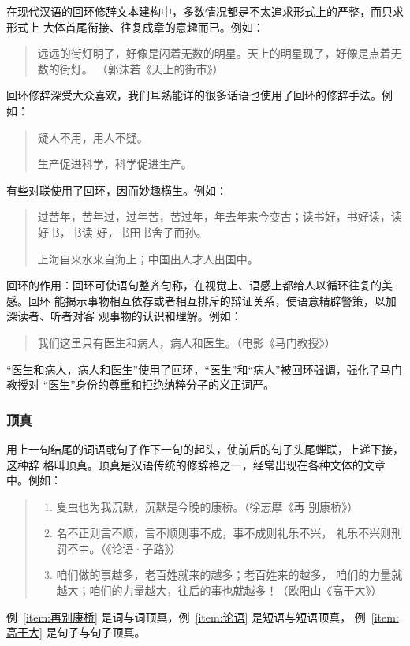 \documentclass[final,oneside]{ctexbook}
\newenvironment{equotation}{\begin{quotation}\kaishu}{\end{quotation}}
\begin{document}
在现代汉语的回环修辞文本建构中，多数情况都是不太追求形式上的严整，而只求形式上
大体首尾衔接、往复成章的意趣而已。例如：
\begin{equotation}
  远远的街灯明了，好像是闪着无数的明星。天上的明星现了，好像是点着无数的街灯。
  （郭沫若《天上的街市》）
\end{equotation}

回环修辞深受大众喜欢，我们耳熟能详的很多话语也使用了回环的修辞手法。例如：
\begin{equotation}
  疑人不用，用人不疑。

  生产促进科学，科学促进生产。
\end{equotation}

有些对联使用了回环，因而妙趣横生。例如：
\begin{equotation}
  过苦年，苦年过，过年苦，苦过年，年去年来今变古；读书好，书好读，读好书，书读
  好，书田书舍子而孙。

  上海自来水来自海上；中国出人才人出国中。
\end{equotation}

回环的作用：回环可使语句整齐匀称，在视觉上、语感上都给人以循环往复的美感。回环
能揭示事物相互依存或者相互排斥的辩证关系，使语意精辟警策，以加深读者、听者对客
观事物的认识和理解。例如：
\begin{equotation}
  我们这里只有医生和病人，病人和医生。（电影《马门教授》）
\end{equotation}
“医生和病人，病人和医生”使用了回环，“医生”和“病人”被回环强调，强化了马门教授对
“医生”身份的尊重和拒绝纳粹分子的义正词严。

\subsubsection{顶真}

用上一句结尾的词语或句子作下一句的起头，使前后的句子头尾蝉联，上递下接，这种辞
格叫顶真。顶真是汉语传统的修辞格之一，经常出现在各种文体的文章中。例如：
\begin{equotation}
  \begin{enumerate}
    \item \label{item:再别康桥} 夏虫也为我沉默，沉默是今晚的康桥。（徐志摩《再
      别康桥》）

    \item \label{item:论语} 名不正则言不顺，言不顺则事不成，事不成则礼乐不兴，
      礼乐不兴则刑罚不中。（《论语·子路》）

    \item \label{item:高干大} 咱们做的事越多，老百姓就来的越多；老百姓来的越多，
      咱们的力量就越大；咱们的力量越大，往后的事也就越多！（欧阳山《高干大》）
  \end{enumerate}
\end{equotation}
例~\ref{item:再别康桥} 是词与词顶真，例~\ref{item:论语} 是短语与短语顶真，
例~\ref{item:高干大} 是句子与句子顶真。
\end{document}
